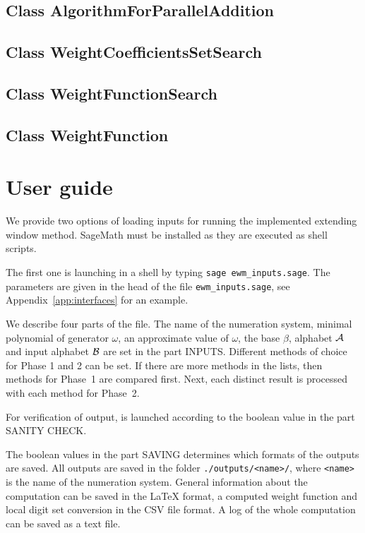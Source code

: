 \subsection*{Class AlgorithmForParallelAddition}



\subsection*{Class WeightCoefficientsSetSearch}



\subsection*{Class WeightFunctionSearch}



\subsection*{Class WeightFunction}



\section{User guide}
We provide two options of loading inputs for running the implemented extending window method. SageMath must be installed as they are executed as shell scripts.

The first one is launching in a shell by typing \verb+sage ewm_inputs.sage+. The parameters are given in the head of the file \verb+ewm_inputs.sage+, see 
Appendix~\ref{app:interfaces} for an example.

 We describe four parts of the file.
The name of the numeration system, minimal polynomial of generator $\omega$, an approximate value of $\omega$, the base $\beta$, alphabet $\mathcal{A}$ and input alphabet $\mathcal{B}$ are set in the part INPUTS. Different methods of choice for Phase 1 and 2 can be set. If there are more methods in the lists, then methods for Phase~1 are compared first. Next, each distinct result is processed with each method for Phase~2.  

For verification of output,  is launched according to the boolean value in the part SANITY CHECK. 

The boolean values in the part SAVING determines which formats of the outputs are saved. All outputs are saved in the folder \verb+./outputs/<name>/+, where \verb+<name>+ is the name of the numeration system. General information about the computation can be saved in the \LaTeX{} format, a computed weight function and local digit set conversion in the CSV file format.  A log of the whole computation can be saved as a text file.

